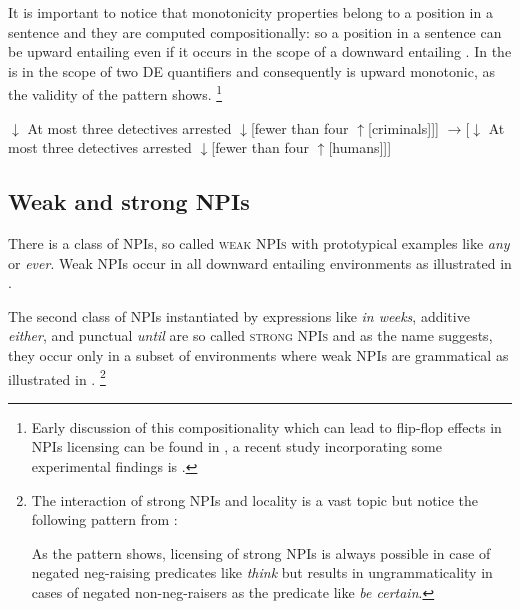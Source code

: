 \documentclass[output=paper, colorlinks, citecolor=brown, newtxmath]{langsci/langscibook}
\begin{document}
\noindent It is important to notice that monotonicity properties belong to a position in a sentence and they are computed compositionally: so a position in a sentence can be upward entailing even if it occurs in the scope of a downward entailing . In  the  is in the scope of two DE quantifiers and consequently is upward monotonic, as the validity of the  pattern shows.%
\footnote{Early discussion of this compositionality which can lead to flip-flop effects in NPIs licensing can be found in \citet{baker1970double}, a recent study incorporating some experimental findings is \citet{geurts2005monotonicity}.}

\ea\label{ex-16} \ea {[}$\downarrow$ At most three detectives arrested
$\downarrow${[}fewer than four $\uparrow${[}criminals{]}{]}{]}
\ex $\rightarrow${[}$\downarrow$ At most three detectives arrested $\downarrow${[}fewer than four $\uparrow${[}humans{]}{]}{]}
\z
\z

\subsection{Weak and strong NPIs}\label{weak-npis}

\noindent There is a class of NPIs, so called \textsc{weak NPIs} with prototypical  examples like  \textit{any} or \textit{ever}. Weak NPIs occur in all downward entailing environments as illustrated in .

\ea\label{ex-17} 
\z
\z

\noindent The second class of NPIs instantiated by  expressions like  \textit{in weeks}, additive \textit{either}, and punctual \textit{until} are so called \textsc{strong NPIs} and as the name suggests, they occur only in a subset of environments where weak NPIs are grammatical as illustrated in .%
\footnote{The interaction of strong NPIs and locality is a vast topic but notice the following pattern from \citet[317]{romoli2013scalar}:

\ea {}
\z
\z

\noindent As the pattern shows, licensing of strong NPIs is always possible in case of negated neg-raising predicates like \textit{think} but results in ungrammaticality in cases of negated non-neg-raisers as the predicate like \textit{be certain}.
}
\end{document}
